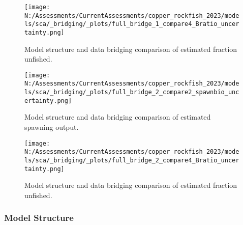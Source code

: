 \documentclass[11pt,
  english,
  letterpaper,
]{article}
\begin{document}
\pagebreak

\begin{figure}
\centering
\texttt{[image: N:/Assessments/CurrentAssessments/copper\_rockfish\_2023/models/sca/\_bridging/\_plots/full\_bridge\_1\_compare4\_Bratio\_uncertainty.png]}
\caption{Model structure and data bridging comparison of estimated fraction unfished.\label{fig:data-bridge-depl-1}}
\end{figure}

\pagebreak

\begin{figure}
\centering
\texttt{[image: N:/Assessments/CurrentAssessments/copper\_rockfish\_2023/models/sca/\_bridging/\_plots/full\_bridge\_2\_compare2\_spawnbio\_uncertainty.png]}
\caption{Model structure and data bridging comparison of estimated spawning output.\label{fig:data-bridge-ssb-2}}
\end{figure}

\pagebreak

\begin{figure}
\centering
\texttt{[image: N:/Assessments/CurrentAssessments/copper\_rockfish\_2023/models/sca/\_bridging/\_plots/full\_bridge\_2\_compare4\_Bratio\_uncertainty.png]}
\caption{Model structure and data bridging comparison of estimated fraction unfished.\label{fig:data-bridge-depl-2}}
\end{figure}

\pagebreak

\hypertarget{model-structure}{%
\subsubsection{Model Structure}\label{model-structure}}
\end{document}
